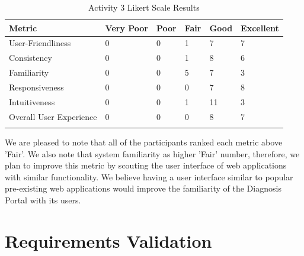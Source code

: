 \begin{longtable}{| p{} | p{} | p{} | p{} | p{} | p{} |} 
    \hline
    		\textbf{Metric}    &\textbf{Very Poor}    &\textbf{Poor}    &\textbf{Fair}    &\textbf{Good}    &\textbf{Excellent}
\\\hline
User-Friendliness  &0   &0   &1   &7  &7   
\\\hline
Consistency  &0   &0   &1   &8   &6  
\\\hline
Familiarity  &0   &0   &5   &7   &3   
\\\hline
Responsiveness  &0   &0   &0   &7   &8   
\\\hline
Intuitiveness  &0   &0   &1   &11   &3   
\\\hline
Overall User Experience  &0   &0   &0   &8   &7   
\\\hline

\caption{Activity 3 Likert Scale Results} \label{metricTest}
\end{longtable}

We are pleased to note that all of the participants ranked each metric above 'Fair'. We also note that system familiarity as higher 'Fair' number, therefore, we plan to improve this metric by scouting the user interface of web applications with similar functionality. We believe having a user interface similar to popular pre-existing web applications would improve the familiarity of the Diagnosis Portal with its users. 

\section{Requirements Validation} \label{reqVal}


